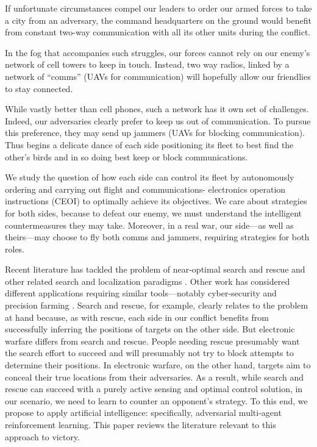 \documentclass{article}
\begin{document}
If unfortunate circumstances compel our leaders to order our armed
forces to take a city from an adversary, the command headquarters on
the ground would benefit from constant two-way communication with all
its other units during the conflict.

In the fog that accompanies such struggles, our forces cannot rely on
our enemy's network of cell towers to keep in touch.  Instead, two way
radios, linked by a network of ``comms'' (UAVs for communication) will
hopefully allow our friendlies to stay connected.

While vastly better than cell phones, such a network has it own set of
challenges.  Indeed, our adversaries clearly prefer to keep us out of
communication.  To pursue this preference, they may send up jammers
(UAVs for blocking communication).  Thus begins a delicate dance of
each side positioning its fleet to best find the other's birds and in
so doing best keep or block communications.

We study the question of how each side can control its fleet by
autonomously ordering and carrying out flight and communications-
electronics operation instructions (CEOI) to optimally achieve its
objectives.  We care about strategies for both sides, because to
defeat our enemy, we must understand the intelligent countermeasures
they may take. Moreover, in a real war, our side---as well as
theirs---may choose to fly both comms and jammers, requiring
strategies for both roles.

Recent literature has tackled the problem of near-optimal search and
rescue \cite{hoffmann2009mobile} and other related search and
localization paradigms \cite{ryan2010particle, tisdale2008multiple,
  gustafsson2002particle}.  Other work has considered different
applications requiring similar tools---notably cyber-security
\cite{nicholson2007information} and precision farming
\cite{testi2020reinforcement}.  Search and rescue, for example,
clearly relates to the problem at hand because, as with rescue, each
side in our conflict benefits from successfully inferring the
positions of targets on the other side.  But electronic warfare
differs from search and rescue.  People needing rescue presumably want
the search effort to succeed and will presumably not try to block
attempts to determine their positions.  In electronic warfare, on the
other hand, targets aim to conceal their true locations from their
adversaries. As a result, while search and rescue can succeed with a
purely active sensing and optimal control solution, in our scenario,
we need to learn to counter an opponent's strategy.  To this end, we
propose to apply artificial intelligence: specifically, adversarial
multi-agent reinforcement learning. This paper reviews the literature
relevant to this approach to victory.
\end{document}
